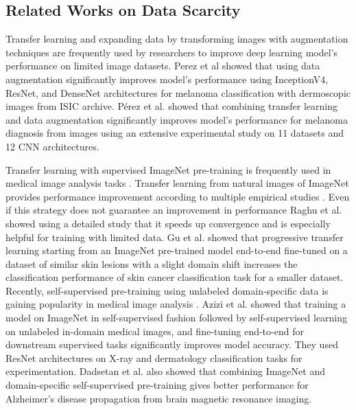 \subsection{Related Works on Data Scarcity}\label{RelWorkDataScarcity}
Transfer learning and expanding data by transforming images with augmentation techniques are frequently used by researchers to improve deep learning model's performance on limited image datasets. Perez et al \cite{Perez2018} showed that using data augmentation significantly improves model's performance using InceptionV4, ResNet, and DenseNet architectures for melanoma classification with dermoscopic images from ISIC archive. P{\'{e}}rez et al. \cite{Perez2021} showed that combining transfer learning and data augmentation significantly improves model's performance for melanoma diagnosis from images using an extensive experimental study on 11 datasets and 12 CNN architectures. 

Transfer learning with supervised ImageNet\cite{Russakovsky2015} pre-training is frequently used in medical image analysis tasks \cite{10.1117/12.2531198, 7950523, McKinney2020, Liu2020, Graziani2019VisualizingAI, Heker2020}. Transfer learning from natural images of ImageNet provides performance improvement according to multiple empirical studies \cite{app10134523, Graziani2019VisualizingAI, Heker2020}. Even if this strategy does not guarantee an improvement in performance Raghu et al. \cite{Raghu2019} showed using a detailed study that it speeds up convergence and is especially helpful for training with limited data. Gu et al. \cite{GuRef} showed that progressive transfer learning starting from an ImageNet pre-trained model end-to-end fine-tuned on a dataset of similar skin lesions with a slight domain shift increases the classification performance of skin cancer classification task for a smaller dataset. Recently, self-supervised pre-training using unlabeled domain-specific data is gaining popularity in medical image analysis \cite{9710396, He2020.04.13.20063941, 9010639, 10.1007/978-3-030-59710-8_39, https://doi.org/10.48550/arxiv.2211.08559, https://doi.org/10.48550/arxiv.2010.05352}. Azizi et al. \cite{9710396} showed that training a model on ImageNet in self-supervised fashion followed by self-supervised learning on unlabeled in-domain medical images, and fine-tuning end-to-end for downstream supervised tasks significantly improves model accuracy. They used ResNet architectures on X-ray and dermatology classification tasks for experimentation. Dadsetan et al. \cite{https://doi.org/10.48550/arxiv.2211.08559} also showed that combining ImageNet and domain-specific self-supervised pre-training gives better performance for Alzheimer's disease propagation from brain magnetic resonance imaging.

